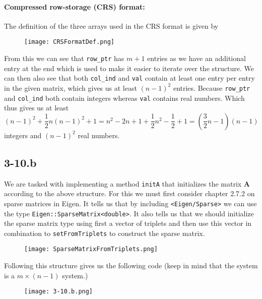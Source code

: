 \documentclass{article}
\begin{document}
\paragraph{Compressed row-storage (CRS) format:} The definition of the three arrays used in the CRS format is given by

\begin{figure}[!hbt]
    \centering
\texttt{[image: CRSFormatDef.png]}
\end{figure}
\noindent From this we can see that \verb|row_ptr| has $m+1$ entries as we have an additional entry at the end which is used to make it easier to iterate over the structure. We can then also see that both \verb|col_ind| and \verb|val| contain at least one entry per entry in the given matrix, which gives us at least $\left(n-1\right)^{2}$ entries. Because \verb|row_ptr| and \verb|col_ind| both contain integers whereas \verb|val| contains real numbers. Which thus gives us at least 
\begin{equation*}
  \left(n-1\right)^{2} + \frac{1}{2}n\left(n-1\right)^{2}  + 1= n^{2} - 2n + 1 + \frac{1}{2}n^{2} - \frac{1}{2} +1  = \left(\frac{3}{2}n - 1\right)\left(n-1\right)
\end{equation*}
integers and $\left(n-1\right)^{2}$ real numbers.

\pagebreak

\subsection*{3-10.b}
We are tasked with implementing a method \verb|initA| that initializes the matrix $\mathbf{A}$ according to the above structure. For this we must first consider chapter 2.7.2 on sparse matrices in Eigen. It tells us that by including \verb|<Eigen/Sparse>| we can use the type \verb|Eigen::SparseMatrix<double>|. It also tells us that we should initialize the sparse matrix type using first a vector of triplets and then use this vector in combination to \verb|setFromTriplets| to construct the sparse matrix.  

\begin{figure}[!hbt]
    \centering
\texttt{[image: SparseMatrixFromTriplets.png]}
\end{figure}

\noindent Following this structure gives us the following code (keep in mind that the system is a $m \times \left(n - 1\right)$ system.)
\begin{figure}[!hbt]
    \centering
\texttt{[image: 3-10.b.png]}
\end{figure}
\end{document}
